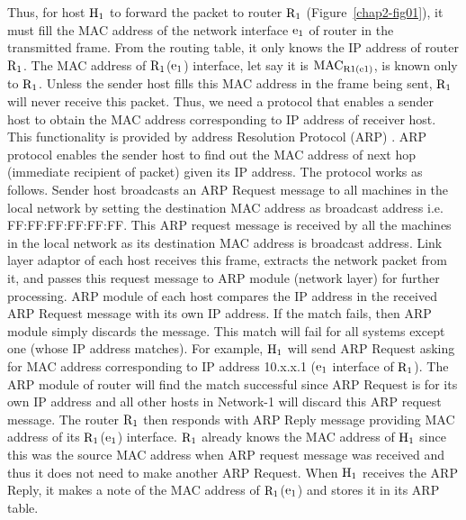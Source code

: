 \begin{multicols}{2}
Thus, for host ${\rm H}_{1}$ to forward the packet to router ${\rm R}_{1}$ (Figure~\ref{chap2-fig01}), it must fill the MAC address of the network interface ${\rm e}_{1}$ of router in the transmitted frame. From the routing table, it only knows the IP address of router ${\rm R}_{1}$. The MAC address of ${\rm R}_{1}$(${\rm e}_{1}$) interface, let say it is ${\rm MAC}_{\rm R1(e1)}$, is known only to ${\rm R}_{1}$. Unless the sender host fills this MAC address in the frame being sent, ${\rm R}_{1}$ will never receive this packet. Thus, we need a protocol that enables a sender host to obtain the MAC address corresponding to IP address of receiver host. This functionality is provided by address Resolution Protocol (ARP) \cite{art2-key03}. ARP protocol enables the sender host to find out the MAC address of next hop (immediate recipient of packet) given its IP address. The protocol works as follows. Sender host broadcasts an ARP Request message to all machines in the local network by setting the destination MAC address as broadcast address i.e. FF:FF:FF:FF:FF:FF. This ARP request message is received by all the machines in the local network as its destination MAC address is broadcast address. Link layer adaptor of each host receives this frame, extracts the network packet from it, and passes this request message to ARP module (network layer) for further processing. ARP module of each host compares the IP address in the received ARP Request message with its own IP address.  If the match fails, then ARP module simply discards the message. This match will fail for all systems except one (whose IP address matches). For example, ${\rm H}_{1}$ will send ARP Request asking for MAC address corresponding to IP address 10.x.x.1 (${\rm e}_{1}$ interface of ${\rm R}_{1}$). The ARP module of router will find the match successful since ARP Request is for its own IP address and all other hosts in Network-1 will discard this ARP request message. The router ${\rm R}_{1}$ then responds with ARP Reply message providing MAC address of its ${\rm R}_{1}$(${\rm e}_{1}$) interface. ${\rm R}_{1}$ already knows the MAC address of ${\rm H}_{1}$ since this was the source MAC address when ARP request message was received and thus it does not need to make another ARP Request. When ${\rm H}_{1}$ receives the ARP Reply, it makes a note of the MAC address of ${\rm R}_{1}$(${\rm e}_{1}$) and stores it in its ARP table.


\end{multicols}
